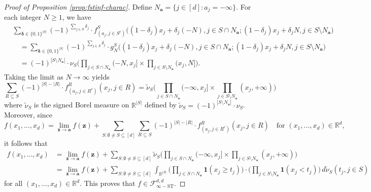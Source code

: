 \documentclass[10pt]{article}
\newcommand{\R}{{\mathbb R}}
\newcommand{\fstinfd}{{\mathcal{F}^{d, d}_{\infty-\text{ST}}}}
\newcommand{\abf}{{\mathbf{a}}}
\newcommand{\zbf}{{\mathbf{z}}}
\newcommand{\deltabf}{{\boldsymbol{\delta}}}
\newcommand{\ind}{{\mathbf{1}}}
\begin{document}
\begin{proof}[Proof of Proposition \ref{prop:fstinf-charac}]
Define $N_{\abf} = \{j \in [d]: a_j = -\infty\}$. For each integer 
$N \ge 1$, we have
\begin{equation*}
\begin{aligned}
    &\sum_{\deltabf \in \{0, 1\}^{|S|}}
    (-1)^{\sum_{j \in S} \delta_j} \cdot 
    f^S_{(a_j, j \in S^c)}\big((1 - \delta_j) x_j + \delta_j (-N), 
    j \in S \cap N_{\abf};
    (1 - \delta_j) x_j + \delta_j N, j \in S \setminus N_{\abf} \big) \\
    &\quad= \sum_{\deltabf \in \{0, 1\}^{|S|}}
    (-1)^{\sum_{j \in S} \delta_j} \cdot 
    g^S_N\big((1 - \delta_j) x_j + \delta_j (-N), j \in S \cap N_{\abf};
    (1 - \delta_j) x_j + \delta_j N, j \in S \setminus N_{\abf} \big) \\
    &\quad= (-1)^{|S \setminus N_{\abf}|} \cdot
    \nu_S\Big(\prod_{j \in S \cap N_{\abf}} (-N, x_j] 
    \times \prod_{j \in S \setminus N_{\abf}} (x_j, N]\Big).
\end{aligned}
\end{equation*}
Taking the limit as $N \to \infty$ yields
\begin{equation*}
    \sum_{R \subseteq S} (-1)^{|S| - |R|} \cdot 
    f^R_{(a_j, j \in R^c)}(x_j, j \in R) 
    = \widetilde{\nu}_S
    \Big(\prod_{j \in S \cap N_{\abf}} (-\infty, x_j] 
    \times \prod_{j \in S \setminus N_{\abf}} (x_j, +\infty)\Big) 
\end{equation*}
where $\widetilde{\nu}_S$ is the signed Borel measure on $\R^{|S|}$ defined 
by 
$\widetilde{\nu}_S = (-1)^{|S \setminus N_{\abf}|} \cdot \nu_S$.
Moreover, since
\begin{equation*}
    f(x_1, \dots, x_d) 
    = \lim_{\zbf \to \abf} f(\zbf)
    + \sum_{S: \emptyset \neq S \subseteq [d]} \sum_{R \subseteq S} 
    (-1)^{|S| - |R|} \cdot f^R_{(a_j, j \in R^c)}(x_j, j \in R)
    \quad \text{for } (x_1, \dots, x_d) \in \R^d,
\end{equation*}
it follows that
\begin{equation*}
\begin{aligned}
    f(x_1, \dots, x_d) 
    &= \lim_{\zbf \to \abf} f(\zbf) 
    + \sum_{S: \emptyset \neq S \subseteq [d]} \widetilde{\nu}_S
    \Big(\prod_{j \in S \cap N_{\abf}} (-\infty, x_j] 
    \times \prod_{j \in S \setminus N_{\abf}} (x_j, +\infty)\Big) \\
    &= \lim_{\zbf \to \abf} f(\zbf) 
    + \sum_{S: \emptyset \neq S \subseteq [d]} \int_{\R^{|S|}} 
    \Big(\prod_{j \in S \cap N_{\abf}} \ind(x_j \ge t_j)\Big)
    \cdot \Big(\prod_{j \in S \setminus N_{\abf}} \ind(x_j < t_j)\Big)
    \, d\widetilde{\nu}_S(t_j, j \in S)
\end{aligned}
\end{equation*}
for all $(x_1, \dots, x_d) \in \R^d$.
This proves that $f \in \fstinfd$.


\end{proof}
\end{document}
